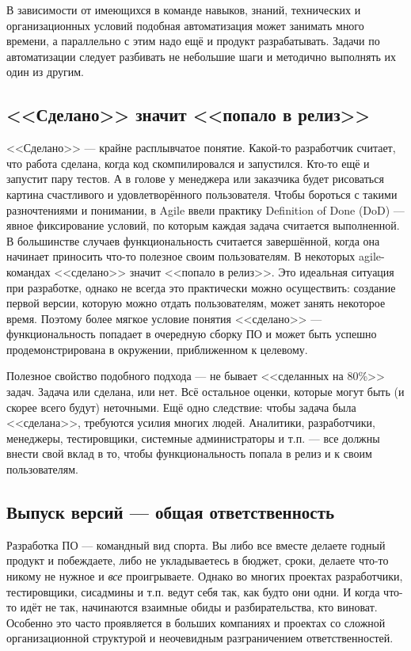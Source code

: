 \documentclass{../../text-style}
\begin{document}
В зависимости от имеющихся в команде навыков, знаний, технических и организационных условий подобная автоматизация может занимать много времени, а параллельно с этим надо ещё и продукт разрабатывать. Задачи по автоматизации следует разбивать не небольшие шаги и методично выполнять их один из другим.

\subsection{<<Сделано>> значит <<попало в релиз>>}

<<Сделано>> --- крайне расплывчатое понятие. Какой-то разработчик считает, что работа сделана, когда код скомпилировался и запустился. Кто-то ещё и запустит пару тестов. А в голове у менеджера или заказчика будет рисоваться картина счастливого и удовлетворённого пользователя. Чтобы бороться с такими разночтениями и понимании, в Agile ввели практику Definition of Done (DoD) --- явное фиксирование условий, по которым каждая задача считается выполненной. В большинстве случаев функциональность считается завершённой, когда она начинает приносить что-то полезное своим пользователям. В некоторых agile-командах <<сделано>> значит <<попало в релиз>>. Это идеальная ситуация при разработке, однако не всегда это практически можно осуществить: создание первой версии, которую можно отдать пользователям, может занять некоторое время. Поэтому более мягкое условие понятия <<сделано>> --- функциональность попадает в очередную сборку ПО и может быть успешно продемонстрирована в окружении, приближенном к целевому.

Полезное свойство подобного подхода --- не бывает <<сделанных на 80\%>> задач. Задача или сделана, или нет. Всё остальное оценки, которые могут быть (и скорее всего будут) неточными. Ещё одно следствие: чтобы задача была <<сделана>>, требуются усилия многих людей. Аналитики, разработчики, менеджеры, тестировщики, системные администраторы и т.п. --- все должны внести свой вклад в то, чтобы функциональность попала в релиз и к своим пользователям.

\subsection{Выпуск версий --- общая ответственность}

Разработка ПО --- командный вид спорта. Вы либо все вместе делаете годный продукт и побеждаете, либо не укладываетесь в бюджет, сроки, делаете что-то никому не нужное и \emph{все} проигрываете. Однако во многих проектах разработчики, тестировщики, сисадмины и т.п. ведут себя так, как будто они одни. И когда что-то идёт не так, начинаются взаимные обиды и разбирательства, кто виноват. Особенно это часто проявляется в больших компаниях и проектах со сложной организационной структурой и неочевидным разграничением ответственностей.
\end{document}
